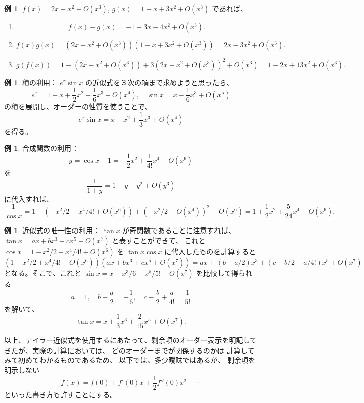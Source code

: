 \documentclass[a4paper]{jsarticle}
\theoremstyle{definition}
\newtheorem{Example}[Theorem]{例}
\newtheorem{Exercise}{問}%
\theoremstyle{remark}
\begin{document}
\begin{Example}
$f(x) = 2x - x^2 + O(x^3)$, $g(x) = 1 - x + 3x^2 + O(x^3)$ であれば、
\begin{enumerate}
\item 
\[
f(x) - g(x) = -1 + 3x -4x^2 + O(x^3). 
\]
\item 
\[
f(x)g(x) = (2x - x^2 + O(x^3))(1-x + 3x^2 + O(x^3))
= 2x - 3x^2 + O(x^3). 
\]
\item 
\[
g(f(x)) = 1 - (2x - x^2 + O(x^3)) + 3(2x - x^2 + O(x^3))^2 + O(x^3) 
= 1 - 2x + 13x^2 + O(x^3). 
\]
\end{enumerate}
\end{Example}

\begin{Example}
積の利用：
$e^x\sin x$ の近似式を３次の項まで求めようと思ったら、
\[
e^x = 1 + x + \frac{1}{2}x^2 + \frac{1}{6} x^3 + O(x^4), 
\quad 
\sin x = x - \frac{1}{6} x^3 + O(x^5)
\]
の積を展開し、オーダーの性質を使うことで、
\[
e^x\sin x = x + x^2 + \frac{1}{3}x^3 + O(x^4)
\]
を得る。
\end{Example}

\begin{Example}
合成関数の利用：
\[
y = \cos x -1 = -\frac{1}{2}x^2 + \frac{1}{4!}x^4 + O(x^6) 
\]
を
\[
\frac{1}{1+y} = 1-y + y^2 + O(y^3)
\]
に代入すれば、
\[
\frac{1}{\cos x} = 1 - (-x^2/2 + x^4/4! + O(x^6)) + (-x^2/2 + O(x^4))^2 + O(x^6) 
= 1 + \frac{1}{2} x^2 + \frac{5}{24} x^4 + O(x^6). 
\]
\end{Example}

\begin{Example}
近似式の唯一性の利用：
$\tan x$ が奇関数であることに注意すれば、$\tan x = ax + bx^3 + cx^5 + O(x^7)$ と表すことができて、
これと $\cos x = 1 - x^2/2 + x^4/4! + O(x^6)$ を $\tan x \cos x$ に代入したものを計算すると
\[
(1 - x^2/2 + x^4/4! + O(x^6)) (ax + bx^3 + cx^5 + O(x^7)) 
= ax + (b-a/2)x^3 + (c - b/2 + a/4!) x^5 + O(x^7) 
\]
となる。そこで、これと $\sin x = x - x^3/6 + x^5/5! + O(x^7)$ を比較して得られる
\[
a = 1, 
\quad 
b - \frac{a}{2} = -\frac{1}{6}, 
\quad 
c - \frac{b}{2} + \frac{a}{4!} = \frac{1}{5!}
\]
を解いて、
\[
\tan x = x + \frac{1}{3}x^3 + \frac{2}{15} x^5 + O(x^7). 
\]
\end{Example}


以上、テイラー近似式を使用するにあたって、剰余項のオーダー表示を明記してきたが、実際の計算においては、
どのオーダーまでが関係するのかは
計算してみて初めてわかるものであるため、
以下では、多少曖昧ではあるが、
剰余項を明示しない
\[
f(x) = f(0) + f'(0) x + \frac{1}{2} f''(0) x^2 + \cdots 
\]
といった書き方も許すことにする。
\end{document}
